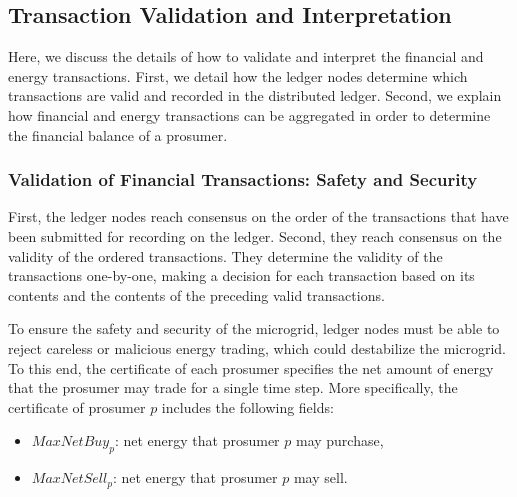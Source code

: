 \documentclass[chi_draft]{sigchi}
\begin{document}
\subsection{Transaction Validation and Interpretation}

Here, we discuss the details of how to validate and interpret the financial and energy transactions.
First, we detail how the ledger nodes determine which transactions are valid and recorded in the distributed ledger.
Second, we explain how financial and energy transactions can be aggregated in order to determine the financial balance of a prosumer.

\subsubsection{Validation of Financial Transactions: Safety and Security}

First, the ledger nodes reach consensus on the order of the transactions that have been submitted for recording on the ledger.
Second, they reach consensus on the validity of the ordered transactions.
They determine the validity of the transactions one-by-one, making a decision for each transaction based on its contents and the contents of the preceding valid transactions.

To ensure the safety and security of the microgrid, ledger nodes must be able to reject careless or malicious energy trading, which could destabilize the microgrid.
To this end, the certificate of each prosumer specifies the net amount of energy that the prosumer may trade for a single time step.
More specifically, the certificate of prosumer $p$ includes the following fields:
\begin{itemize}
\item $MaxNetBuy_p$: net energy that prosumer $p$ may purchase,
\item $MaxNetSell_p$: net energy that prosumer $p$ may sell.
\end{itemize}
\end{document}

